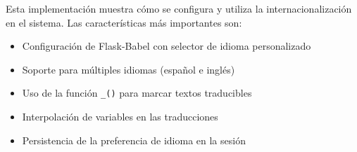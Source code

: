Esta implementación muestra cómo se configura y utiliza la internacionalización en el sistema. Las características más importantes son:

\begin{itemize}
    \item Configuración de Flask-Babel con selector de idioma personalizado
    \item Soporte para múltiples idiomas (español e inglés)
    \item Uso de la función \texttt{\_()} para marcar textos traducibles
    \item Interpolación de variables en las traducciones
    \item Persistencia de la preferencia de idioma en la sesión
\end{itemize}
